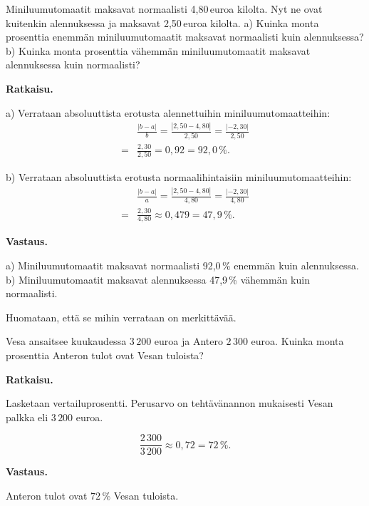 \begin{esimerkki}
    Miniluumutomaatit maksavat normaalisti 4,80\,euroa kilolta. Nyt ne ovat kuitenkin alennuksessa ja maksavat 2,50\,euroa kilolta.
     \newline a) Kuinka monta prosenttia enemmän miniluumutomaatit maksavat normaalisti kuin alennuksessa?
     \newline b) Kuinka monta prosenttia vähemmän miniluumutomaatit maksavat alennuksessa kuin normaalisti?
     
     \textbf{Ratkaisu.}
     
a) Verrataan absoluuttista erotusta alennettuihin miniluumutomaatteihin:
\begin{align*}
     &\frac{|b-a|}{b}  = \frac{|2,50-4,80|}{2,50} = \frac{|-2,30|}{2,50} \\
     = &\frac{2,30}{2,50}  = 0,92 = 92,0\,\%.
\end{align*}
    
    
b) Verrataan absoluuttista erotusta normaalihintaisiin miniluumutomaatteihin:
\begin{align*}
     &\frac{|b-a|}{a} = \frac{|2,50-4,80|}{4,80} = \frac{|-2,30|}{4,80} \\
     = &\frac{2,30}{4,80}  \approx 0,479  = 47,9\,\%.
\end{align*}

     \textbf{Vastaus.}
     
     a) Miniluumutomaatit maksavat normaalisti 92,0\,\% enemmän kuin alennuksessa.
     \newline b) Miniluumutomaatit maksavat alennuksessa 47,9\,\% vähemmän kuin normaalisti.
     
     Huomataan, että se mihin verrataan on merkittävää.
     \end{esimerkki}
    

\begin{esimerkki}
    Vesa ansaitsee kuukaudessa ${3\,200}$ euroa ja Antero ${2\,300}$ euroa.
    Kuinka monta prosenttia Anteron tulot ovat Vesan tuloista? 
    
    \textbf{Ratkaisu.}
    
    Lasketaan vertailuprosentti. Perusarvo on tehtävänannon mukaisesti
    Vesan palkka eli ${3\,200}$ euroa.
    
    \[
        \frac{2\,300}{3\,200} 
        \approx 0,72
        = 72\,\%.
    \]
    
    \textbf{Vastaus.}
    
    Anteron tulot ovat $72\,\%$ Vesan tuloista.
\end{esimerkki}

